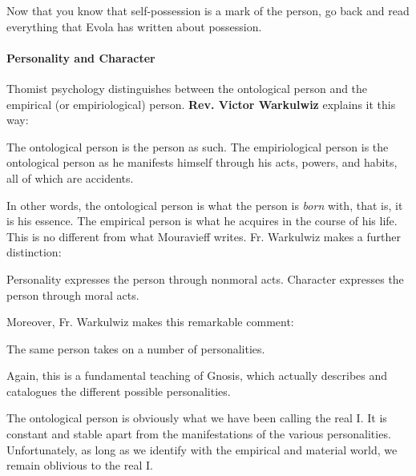 Now that you know that self-possession is a mark of the person, go back and read everything that Evola has written about possession.

\paragraph{Personality and Character}
Thomist psychology distinguishes between the ontological person and the empirical (or empiriological) person. \textbf{Rev. Victor Warkulwiz} explains it this way:

\begin{quotex}
The ontological person is the person as such. The empiriological person is the ontological person as he manifests himself through his acts, powers, and habits, all of which are accidents. 

\end{quotex}
In other words, the ontological person is what the person is \emph{born} with, that is, it is his essence. The empirical person is what he acquires in the course of his life. This is no different from what Mouravieff writes. Fr. Warkulwiz makes a further distinction:

\begin{quotex}
Personality expresses the person through nonmoral acts. Character expresses the person through moral acts. 

\end{quotex}
Moreover, Fr. Warkulwiz makes this remarkable comment:

\begin{quotex}
The same person takes on a number of personalities. 

\end{quotex}
Again, this is a fundamental teaching of Gnosis, which actually describes and catalogues the different possible personalities.

The ontological person is obviously what we have been calling the real I. It is constant and stable apart from the manifestations of the various personalities. Unfortunately, as long as we identify with the empirical and material world, we remain oblivious to the real I.




